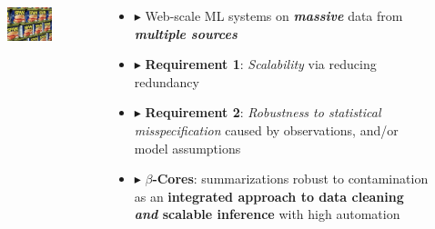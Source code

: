 \documentclass[hyperref={colorlinks = true},unknownkeysallowed]{beamer}
\begin{document}
\begin{frame}[fragile,t]
\begin{columns}[onlytextwidth]
\begin{column}{0.35\textwidth}
\begin{center}
				\vspace{-.35cm} 
				
				\begin{figure}
					\includegraphics[width=0.9\textwidth,angle=-5]{figs/spam.jpg}
				\end{figure}
			\end{center}
		\end{column}
		\begin{column}{0.65\textwidth}
			\vspace{-2.6cm} 
			
			\begin{itemize}
				\item $\blacktriangleright$ Web-scale ML systems on \emph{\textbf{massive}} data from \emph{\textbf{multiple sources}}
				\item $\blacktriangleright$ \textbf{Requirement 1}: \emph{Scalability}  via reducing redundancy
				\item $\blacktriangleright$ \textbf{Requirement 2}: \emph{Robustness to statistical misspecification} caused by observations, and/or model assumptions   
				\item $\blacktriangleright$ \textbf{$\beta$-Cores}: summarizations robust to contamination as an \textbf{integrated approach to data cleaning \emph{and} scalable inference} with high automation
			\end{itemize}
		\end{column}
	\end{columns}
\end{frame}
\end{document}
